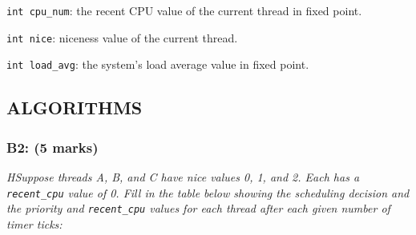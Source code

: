 \documentclass{article}
\begin{document}
\texttt{int cpu\_num}: the recent CPU value of the current thread in fixed point.

\texttt{int nice}: niceness value of the current thread.

\texttt{int load\_avg}: the system's load average value in fixed point.


\subsection{ALGORITHMS}

\subsubsection*{B2: (5 marks) }
\textit{HSuppose threads A, B, and C have nice values 0, 1, and 2.  Each has a \texttt{recent\_cpu} value of 0.  Fill in the table below showing the scheduling decision and the priority and \texttt{recent\_cpu} values for each thread after each given number of timer ticks:}
\end{document}
